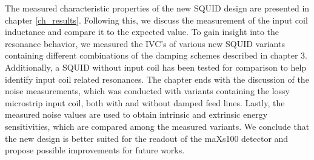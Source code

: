The measured characteristic properties of the new SQUID design are presented in chapter \ref{ch_results}. Following this, we discuss the measurement of the input coil inductance and compare it to the expected value. To gain insight into the resonance behavior, we measured the IVC's of various new SQUID variants containing different combinations of the damping schemes described in chapter 3. Additionally, a SQUID without input coil has been tested for comparison to help identify input coil related resonances. The chapter ends with the discussion of the noise measurements, which was conducted with variants containing the lossy microstrip input coil, both with and without damped feed lines. Lastly, the measured noise values are used to obtain intrinsic and extrinsic energy sensitivities, which are compared among the measured variants. We conclude that the new design is better suited for the readout of the maXs100 detector and propose possible improvements for future works.    